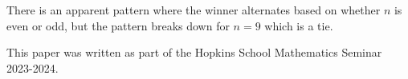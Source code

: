 \documentclass{article}
\newtheorem{conjecture}[theorem]{Conjecture}
\begin{document}
There is an apparent pattern where the winner alternates based on whether $n$ is even or odd, but the pattern breaks down for $n=9$ which is a tie. 


    

\vskip 20pt
This paper was written as part of the Hopkins School Mathematics Seminar 2023-2024. 


\end{document}
